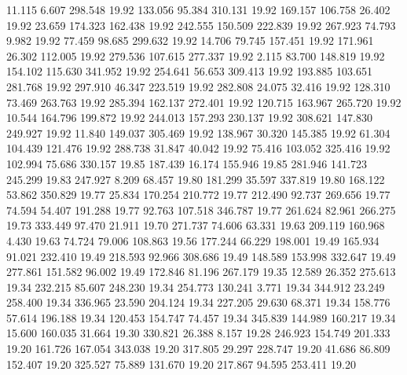   11.115    6.607  298.548        19.92
 133.056   95.384  310.131        19.92
 169.157  106.758   26.402        19.92
  23.659  174.323  162.438        19.92
 242.555  150.509  222.839        19.92
 267.923   74.793    9.982        19.92
  77.459   98.685  299.632        19.92
  14.706   79.745  157.451        19.92
 171.961   26.302  112.005        19.92
 279.536  107.615  277.337        19.92
   2.115   83.700  148.819        19.92
 154.102  115.630  341.952        19.92
 254.641   56.653  309.413        19.92
 193.885  103.651  281.768        19.92
 297.910   46.347  223.519        19.92
 282.808   24.075   32.416        19.92
 128.310   73.469  263.763        19.92
 285.394  162.137  272.401        19.92
 120.715  163.967  265.720        19.92
  10.544  164.796  199.872        19.92
 244.013  157.293  230.137        19.92
 308.621  147.830  249.927        19.92
  11.840  149.037  305.469        19.92
 138.967   30.320  145.385        19.92
  61.304  104.439  121.476        19.92
 288.738   31.847   40.042        19.92
  75.416  103.052  325.416        19.92
 102.994   75.686  330.157        19.85
 187.439   16.174  155.946        19.85
 281.946  141.723  245.299        19.83
 247.927    8.209   68.457        19.80
 181.299   35.597  337.819        19.80
 168.122   53.862  350.829        19.77
  25.834  170.254  210.772        19.77
 212.490   92.737  269.656        19.77
  74.594   54.407  191.288        19.77
  92.763  107.518  346.787        19.77
 261.624   82.961  266.275        19.73
 333.449   97.470   21.911        19.70
 271.737   74.606   63.331        19.63
 209.119  160.968    4.430        19.63
  74.724   79.006  108.863        19.56
 177.244   66.229  198.001        19.49
 165.934   91.021  232.410        19.49
 218.593   92.966  308.686        19.49
 148.589  153.998  332.647        19.49
 277.861  151.582   96.002        19.49
 172.846   81.196  267.179        19.35
  12.589   26.352  275.613        19.34
 232.215   85.607  248.230        19.34
 254.773  130.241    3.771        19.34
 344.912   23.249  258.400        19.34
 336.965   23.590  204.124        19.34
 227.205   29.630   68.371        19.34
 158.776   57.614  196.188        19.34
 120.453  154.747   74.457        19.34
 345.839  144.989  160.217        19.34
  15.600  160.035   31.664        19.30
 330.821   26.388    8.157        19.28
 246.923  154.749  201.333        19.20
 161.726  167.054  343.038        19.20
 317.805   29.297  228.747        19.20
  41.686   86.809  152.407        19.20
 325.527   75.889  131.670        19.20
 217.867   94.595  253.411        19.20

